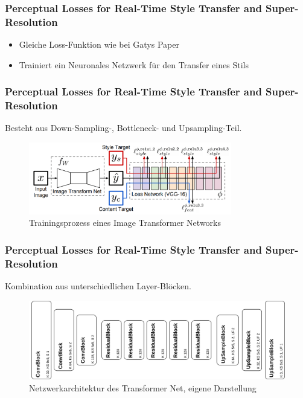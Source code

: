 \begin{frame}
    \frametitle{Perceptual Losses for Real-Time Style Transfer and Super-Resolution \cite{DBLP:journals/corr/JohnsonAL16}}

    \begin{itemize}
        \item Gleiche Loss-Funktion wie bei Gatys Paper
        \item Trainiert ein Neuronales Netzwerk für den Transfer eines Stils
    \end{itemize}
\end{frame}


\begin{frame}
    \frametitle{Perceptual Losses for Real-Time Style Transfer and Super-Resolution \cite{DBLP:journals/corr/JohnsonAL16}}

    Besteht aus Down-Sampling-, Bottleneck- und Upsampling-Teil.

    \pause

    \begin{figure}[H]
        \centering
        \includegraphics[width=0.79\textwidth]{resources/content/fast_neural_style.png}
        \caption{Trainingsprozess eines Image Transformer Networks \cite{DBLP:journals/corr/JohnsonAL16}}
        \label{img:fast_neural_style_transfer}
    \end{figure}
\end{frame}

\begin{frame}
    \frametitle{Perceptual Losses for Real-Time Style Transfer and Super-Resolution \cite{DBLP:journals/corr/JohnsonAL16}}

    Kombination aus unterschiedlichen Layer-Blöcken.
    
    \pause

    \begin{figure}[H]
        \centering
        \includegraphics[width=1.0\textwidth]{resources/content/transformer_net.png}
        \caption{Netzwerkarchitektur des Transformer Net, eigene Darstellung}
        \label{img:transformer_net_img}
    \end{figure}    
\end{frame}

